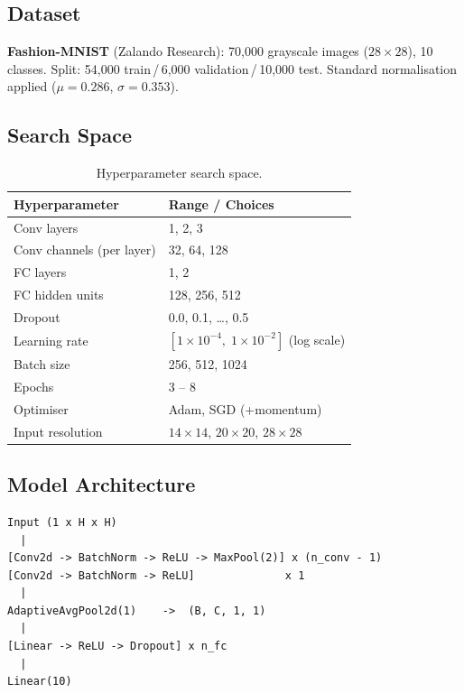\documentclass[12pt,a4paper]{article}
\begin{document}
\subsection{Dataset}
\textbf{Fashion-MNIST} (Zalando Research): 70{,}000 grayscale images ($28{\times}28$), 10 classes.
Split: 54{,}000 train\,/\,6{,}000 validation\,/\,10{,}000 test.
Standard normalisation applied ($\mu = 0.286$, $\sigma = 0.353$).

\subsection{Search Space}

\begin{table}[H]
\centering
\begin{tabular}{lL{7.5cm}}
\toprule
\textbf{Hyperparameter} & \textbf{Range / Choices} \\
\midrule
Conv layers          & 1, 2, 3 \\
Conv channels (per layer) & 32, 64, 128 \\
FC layers            & 1, 2 \\
FC hidden units      & 128, 256, 512 \\
Dropout              & 0.0, 0.1, \ldots, 0.5 \\
Learning rate        & $[1{\times}10^{-4},\; 1{\times}10^{-2}]$ (log scale) \\
Batch size           & 256, 512, 1024 \\
Epochs               & 3 -- 8 \\
Optimiser            & Adam, SGD (+momentum) \\
Input resolution     & $14{\times}14$, $20{\times}20$, $28{\times}28$ \\
\bottomrule
\end{tabular}
\caption{Hyperparameter search space.}
\end{table}

\subsection{Model Architecture}

\begin{lstlisting}
Input (1 x H x H)
  |
[Conv2d -> BatchNorm -> ReLU -> MaxPool(2)] x (n_conv - 1)
[Conv2d -> BatchNorm -> ReLU]              x 1
  |
AdaptiveAvgPool2d(1)    ->  (B, C, 1, 1)
  |
[Linear -> ReLU -> Dropout] x n_fc
  |
Linear(10)
\end{lstlisting}
\end{document}
